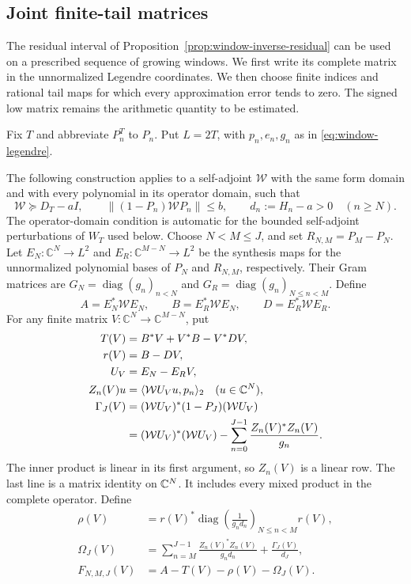 \subsection{Joint finite-tail matrices}
\label{sec:window-joint-cofinal}

The residual interval of Proposition~\ref{prop:window-inverse-residual}
can be used on a prescribed sequence of growing windows.  We first
write its complete matrix in the unnormalized Legendre coordinates.
We then choose finite indices and rational tail maps for which every
approximation error tends to zero.  The signed low matrix remains the
arithmetic quantity to be estimated.

Fix $T$ and abbreviate $P_n^T$ to $P_n$.  Put $L=2T$, with
$p_n,e_n,g_n$ as in \eqref{eq:window-legendre}.

The following construction applies to a self-adjoint
$\mathcal W$ with the same form domain and with every polynomial
in its operator domain, such that
\[
 \mathcal W\succeq D_T-aI,\qquad
 \|(1-P_n)\mathcal WP_n\|\le b,
 \qquad d_n:=H_n-a>0\quad(n\ge N).
\]
The operator-domain condition is automatic for the bounded
self-adjoint perturbations of $W_T$ used below.
Choose $N<M\le J$, and set $R_{N,M}=P_M-P_N$. Let
$E_N:\mathbb C^N\to L^2$ and
$E_R:\mathbb C^{M-N}\to L^2$ be the synthesis maps for the
unnormalized polynomial bases of $P_N$ and $R_{N,M}$, respectively.
Their Gram matrices are $G_N=\operatorname{diag}(g_n)_{n<N}$
and $G_R=\operatorname{diag}(g_n)_{N\le n<M}$.
Define
\[
 A=E_N^*\mathcal WE_N,\qquad
 B=E_R^*\mathcal WE_N,\qquad
 D=E_R^*\mathcal WE_R.
\]
For any finite matrix $V:\mathbb C^N\to\mathbb C^{M-N}$, put
\begin{align}
 T(V)&=B^*V+V^*B-V^*DV,\\
 r(V)&=B-DV,\\
 U_V&=E_N-E_RV,\\
 Z_n(V)u&=\langle\mathcal W U_Vu,p_n\rangle_2\quad(u\in\mathbb C^N),\\
 \Gamma_J(V)&=(\mathcal WU_V)^*(1-P_J)(\mathcal WU_V)\\
 &= (\mathcal WU_V)^*(\mathcal WU_V)
       -\sum_{n=0}^{J-1}\frac{Z_n(V)^*Z_n(V)}{g_n}.
\end{align}
The inner product is linear in its first argument, so $Z_n(V)$
is a linear row.  The last line is a matrix identity on $\mathbb C^N$.
It includes every mixed product in the complete operator. Define
\begin{align}
 \rho(V)&=r(V)^*
 \operatorname{diag}\!\left(\frac1{g_nd_n}\right)_{N\le n<M}
 r(V),\\
 \Omega_J(V)&=
 \sum_{n=M}^{J-1}\frac{Z_n(V)^*Z_n(V)}{g_nd_n}
 +\frac{\Gamma_J(V)}{d_J},\\
 F_{N,M,J}(V)&=A-T(V)-\rho(V)-\Omega_J(V).
 \label{eq:cofinal-joint-matrix}
\end{align}

